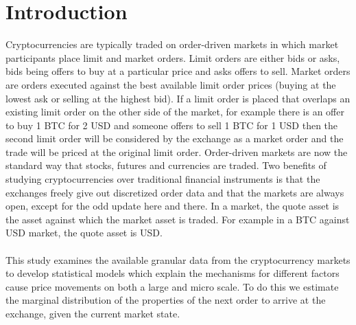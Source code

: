 \documentclass[a4paper,10pt]{article}
\begin{document}
\section{Introduction}
Cryptocurrencies are typically traded on order-driven markets in which market participants place limit and market orders. Limit orders are either bids or asks, bids being offers to buy at a particular price and asks offers to sell. Market orders are orders executed against the best available limit order prices (buying at the lowest ask or selling at the highest bid). If a limit order is placed that overlaps an existing limit order on the other side of the market, for example there is an offer to buy 1 BTC for 2 USD and someone offers to sell 1 BTC for 1 USD then the second limit order will be considered by the exchange as a market order and the trade will be priced at the original limit order. Order-driven markets are now the standard way that stocks, futures and currencies are traded. Two benefits of studying cryptocurrencies over traditional financial instruments is that the exchanges freely give out discretized order data and that the markets are always open, except for the odd update here and there. In a market, the quote asset is the asset against which the market asset is traded. For example in a BTC against USD market, the quote asset is USD.\\ \\
This study examines the available granular data from the cryptocurrency markets to develop statistical models which explain the mechanisms for different factors cause price movements on both a large and micro scale. To do this we estimate the marginal distribution of the properties of the next order to arrive at the exchange, given the current market state. \\ \\
\end{document}
